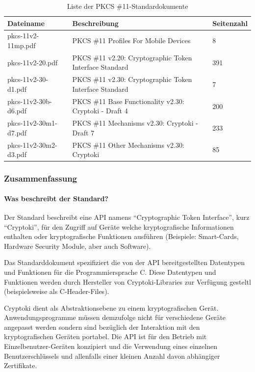 \documentclass[10pt,a4paper]{article}
\begin{document}
\begin{table}[ht]
    \centering
    \begin{tabular}{|l|p{5cm}|l|} \hline
        \textbf{Dateiname} & \textbf{Beschreibung} & \textbf{Seitenzahl} \\\hline
        pkcs-11v2-11mp.pdf & PKCS \#11 Profiles For Mobile Devices & 8 \\\hline
        pkcs-11v2-20.pdf & PKCS \#11 v2.20: Cryptographic Token Interface Standard & 391
            \\\hline
        pkcs-11v2-30-d1.pdf & PKCS \#11 v2.30: Cryptographic Token Interface Standard & 7
            \\\hline
        pkcs-11v2-30b-d6.pdf & PKCS \#11 Base Functionality v2.30: Cryptoki - Draft 4 & 200
            \\\hline
        pkcs-11v2-30m1-d7.pdf & PKCS \#11 Mechanisms v2.30: Cryptoki - Draft 7 & 233
            \\\hline
        pkcs-11v2-30m2-d3.pdf & PKCS \#11 Other Mechanisms v2.30: Cryptoki & 85 \\\hline
    \end{tabular}
    \caption{Liste der PKCS \#11-Standardokumente}
    \label{tab:pkcs11-doclist}
\end{table}

\subsubsection{Zusammenfassung}

\paragraph{Was beschreibt der Standard?}
Der Standard beschreibt eine API namens "`Cryptographic Token Interface"', kurz
"`Cryptoki"', für den Zugriff auf Geräte welche kryptografische Informationen enthalten
oder kryptografische Funktionen ausführen (Beispiele: Smart-Cards, Hardware Security
Module, aber auch Software).

Das Standarddokument spezifiziert die von der API bereitgestellten Datentypen und
Funktionen für die Programmiersprache C. Diese Datentypen und Funktionen werden durch
Hersteller von Cryptoki-Libraries zur Verfügung gesteltl (beispielsweise als
C-Header-Files).

Cryptoki dient als Abstraktionsebene zu einem kryptografischen Gerät. Anwendungsprogramme
müssen demzufolge nicht für verschiedene Geräte angepasst werden sondern sind bezüglich
der Interaktion mit den kryptografischen Geräten portabel. Die API ist für den Betrieb
mit Einzelbenutzer-Geräten konzipiert und die Verwendung eines einzelnen
Benutzerschlüssels und allenfalls einer kleinen Anzahl davon abhängiger Zertifikate.
\end{document}

